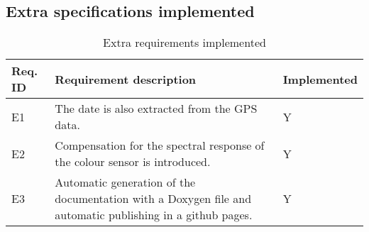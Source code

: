 \subsection{Extra specifications implemented}
\begin{table}[H]
    \begin{center}
        \begin{tabular}{|p{} | p{} | p{}|}
            \hline
            \textbf{Req. ID} & \textbf{Requirement description} & \textbf{Implemented}\\
            \hline
            E1 & The date is also extracted from the GPS data. & Y\\
            \hline
            E2 & Compensation for the spectral response of the colour sensor is introduced. & Y\\
            \hline
            E3 & Automatic generation of the documentation with a Doxygen file and automatic publishing in a github pages. & Y\\
            \hline
        \end{tabular} 
    \end{center}
    \caption{Extra requirements implemented}
    \label{ReqExtra}
\end{table}